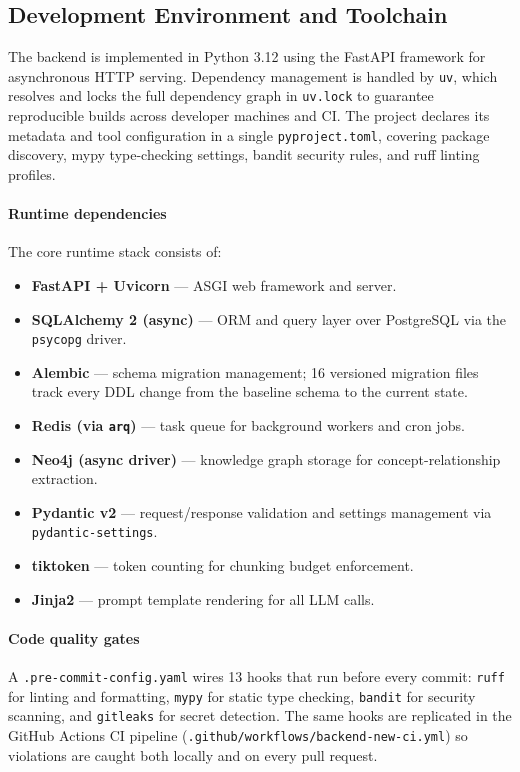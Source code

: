 \subsection{Development Environment and Toolchain}
\label{sec:impl_env}

The backend is implemented in Python 3.12 using the FastAPI framework for asynchronous HTTP serving. Dependency management is handled by \texttt{uv}, which resolves and locks the full dependency graph in \texttt{uv.lock} to guarantee reproducible builds across developer machines and CI. The project declares its metadata and tool configuration in a single \texttt{pyproject.toml}, covering package discovery, mypy type-checking settings, bandit security rules, and ruff linting profiles.

\paragraph{Runtime dependencies}
The core runtime stack consists of:
\begin{itemize}
    \item \textbf{FastAPI + Uvicorn} — ASGI web framework and server.
    \item \textbf{SQLAlchemy 2 (async)} — ORM and query layer over PostgreSQL via the \texttt{psycopg} driver.
    \item \textbf{Alembic} — schema migration management; 16 versioned migration files track every DDL change from the baseline schema to the current state.
    \item \textbf{Redis (via \texttt{arq})} — task queue for background workers and cron jobs.
    \item \textbf{Neo4j (async driver)} — knowledge graph storage for concept-relationship extraction.
    \item \textbf{Pydantic v2} — request/response validation and settings management via \texttt{pydantic-settings}.
    \item \textbf{tiktoken} — token counting for chunking budget enforcement.
    \item \textbf{Jinja2} — prompt template rendering for all LLM calls.
\end{itemize}

\paragraph{Code quality gates}
A \texttt{.pre-commit-config.yaml} wires 13 hooks that run before every commit: \texttt{ruff} for linting and formatting, \texttt{mypy} for static type checking, \texttt{bandit} for security scanning, and \texttt{gitleaks} for secret detection. The same hooks are replicated in the GitHub Actions CI pipeline (\texttt{.github/workflows/backend-new-ci.yml}) so violations are caught both locally and on every pull request.

